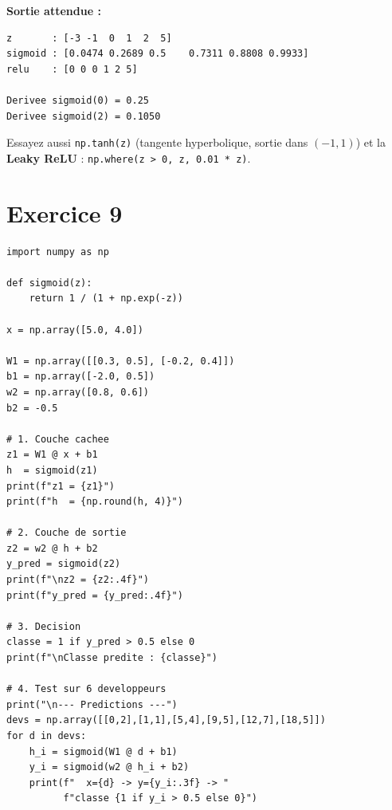 \textbf{Sortie attendue :}
\begin{verbatim}
z       : [-3 -1  0  1  2  5]
sigmoid : [0.0474 0.2689 0.5    0.7311 0.8808 0.9933]
relu    : [0 0 0 1 2 5]

Derivee sigmoid(0) = 0.25
Derivee sigmoid(2) = 0.1050
\end{verbatim}

\begin{intuitionbox}[Variante]
    Essayez aussi \texttt{np.tanh(z)} (tangente hyperbolique, sortie dans $(-1, 1)$)
    et la \textbf{Leaky ReLU} : \texttt{np.where(z > 0, z, 0.01 * z)}.
\end{intuitionbox}

\section*{Exercice 9 \hfill \exointermediaire}

\separateur

\begin{pythonbox}
\begin{lstlisting}
import numpy as np

def sigmoid(z):
    return 1 / (1 + np.exp(-z))

x = np.array([5.0, 4.0])

W1 = np.array([[0.3, 0.5], [-0.2, 0.4]])
b1 = np.array([-2.0, 0.5])
w2 = np.array([0.8, 0.6])
b2 = -0.5

# 1. Couche cachee
z1 = W1 @ x + b1
h  = sigmoid(z1)
print(f"z1 = {z1}")
print(f"h  = {np.round(h, 4)}")

# 2. Couche de sortie
z2 = w2 @ h + b2
y_pred = sigmoid(z2)
print(f"\nz2 = {z2:.4f}")
print(f"y_pred = {y_pred:.4f}")

# 3. Decision
classe = 1 if y_pred > 0.5 else 0
print(f"\nClasse predite : {classe}")

# 4. Test sur 6 developpeurs
print("\n--- Predictions ---")
devs = np.array([[0,2],[1,1],[5,4],[9,5],[12,7],[18,5]])
for d in devs:
    h_i = sigmoid(W1 @ d + b1)
    y_i = sigmoid(w2 @ h_i + b2)
    print(f"  x={d} -> y={y_i:.3f} -> "
          f"classe {1 if y_i > 0.5 else 0}")
\end{lstlisting}
\end{pythonbox}

